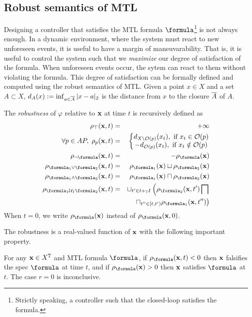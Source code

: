 \subsection{Robust semantics of MTL}
\label{sec:rob sem}
Designing a controller that satisfies the MTL formula $\formula$\footnote{Strictly speaking, a controller such that the closed-loop satisfies the formula.} is not always enough.
In a dynamic environment, where the system must react to new unforeseen events, it is useful to have a margin of maneuvarability.
That is, it is useful to control the system such that we \textit{maximize} our degree of satisfaction of the formula.
When unforeseen events occur, the sytem can react to them without violating the formula.
This degree of satisfaction can be formally defined and computed using the robust semantics of MTL.
Given a point $x \in X$ and a set $A \subset X$, $d_A(x) := \inf_{a \in \overline{A}}|x-a|_2$ is the distance from $x$  to the closure $\overline{A}$ of $A$.
\begin{definition}
	\label{def:robustness estimate}
	The \emph{robustness} of $\varphi$ relative to $\mathbf{x}$ at time $t$ is recursively defined as 
	\begin{eqnarray*}
		\label{eq:robustness estimate}
		\rob_{\top} (\sstraj,t) &=& +\infty
		\\
		\forall p \in AP, \;  \rob_{p} (\sstraj,t) &=& \left \lbrace \begin{matrix}
			d_{\stSet \setminus \Oc(p)}(\stPt_t), \text{ if } \stPt_t \in \Oc(p)
			\\
			-d_{ \Oc(p)}(\stPt_t), \text{ if } \stPt_t \notin \Oc(p)			
		\end{matrix} \right.
		\\
		\rob_{\lnot \formula} (\sstraj,t) &=& - \rob_{\formula} (\sstraj)
		\\
		\rob_{ \formula_1 \lor \formula_2} (\sstraj,t) &=& \rob_{\formula_1} (\sstraj) \sqcup \rob_{\formula_2} (\sstraj) 
		\\
		\rob_{ \formula_1 \land \formula_2} (\sstraj,t) &=& \rob_{\formula_1} (\sstraj) \sqcap \rob_{\formula_2} (\sstraj) 
		\\
		\rob_{ \formula_1 \until_I \formula_2} (\sstraj,t) &=& \sqcup_{t' \in t+_{\TDom}I} \left(\rob_{\formula_2} (\sstraj,t') \bigsqcap \right.
		\\
		&& \left. \sqcap_{t'' \in [t,t')}   \rob_{\formula_1} (\sstraj,t'') \right) 
	\end{eqnarray*}
	When $t=0$, we write $\robf(\sstraj)$ instead of $\robf(\sstraj,0)$.
\end{definition}
The robustness is a real-valued function of $\mathbf{x}$ with the following important property.
\begin{theorem} \cite{FainekosP09tcs}
	\label{thm:rob objective}
	For any $\mathbf{x} \in X^{\mathbb{T}}$ and MTL formula $\formula$, 
	if $\robf(\sstraj,t) <0$ then $\mathbf{x}$ falsifies the spec $\formula$ at time $t$, and if $\robf(\sstraj) > 0$ then $\mathbf{x}$ satisfies $\formula$ at $t$. 
	The case $r =0$ is inconclusive.
\end{theorem} 

